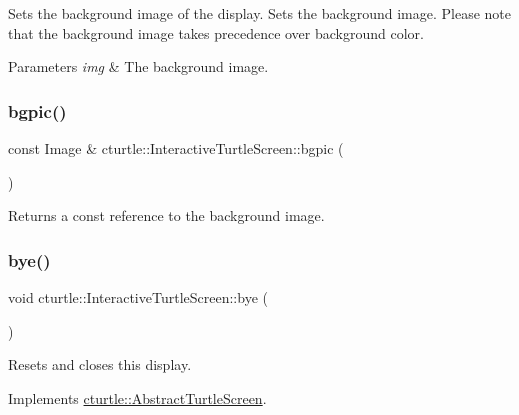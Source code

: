 Sets the background image of the display. Sets the background image. Please note that the background image takes precedence over background color. 


\begin{DoxyParams}{Parameters}
{\em img} & The background image. \\
\hline
\end{DoxyParams}
\mbox{\label{classcturtle_1_1InteractiveTurtleScreen_a38a7be849056a8450e97b15e3a02d545}} 
\subsubsection{\texorpdfstring{bgpic()}{bgpic()}\hspace{0.1cm}{\footnotesize\ttfamily [2/2]}}
{\footnotesize\ttfamily const Image \& cturtle\+::\+Interactive\+Turtle\+Screen\+::bgpic (\begin{DoxyParamCaption}{ }\end{DoxyParamCaption})}

Returns a const reference to the background image. \mbox{\label{classcturtle_1_1InteractiveTurtleScreen_a045b2cc0c8869140015abcc11226a714}} 
\subsubsection{\texorpdfstring{bye()}{bye()}}
{\footnotesize\ttfamily void cturtle\+::\+Interactive\+Turtle\+Screen\+::bye (\begin{DoxyParamCaption}{ }\end{DoxyParamCaption})\hspace{0.3cm}{\ttfamily [virtual]}}

Resets and closes this display. 

Implements \hyperlink{classcturtle_1_1AbstractTurtleScreen}{cturtle\+::\+Abstract\+Turtle\+Screen}.

\mbox{\label{classcturtle_1_1InteractiveTurtleScreen_a60eecd547f88d1e52b1d0917693bffb8}} 
